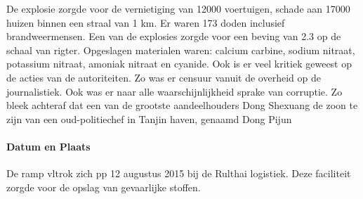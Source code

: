 \documentclass{article}
\begin{document}
	De explosie zorgde voor de vernietiging van 12000 voertuigen, schade aan 17000 huizen binnen een straal van 1 km. Er waren 173 doden inclusief brandweermensen.
	Een van de explosies zorgde voor  een beving van 2.3 op de schaal van rigter.
	Opgeslagen materialen  waren: calcium carbine, sodium nitraat, potassium nitraat, amoniak nitraat en cyanide.
	Ook is er veel kritiek geweest op de acties van de autoriteiten. Zo was er censuur vanuit de overheid op de journalistiek.
	Ook was er naar alle waarschijnlijkheid sprake van corruptie. Zo bleek achteraf dat een van de grootste aandeelhouders Dong Shexuang de zoon te zijn van een oud-politiechef in Tanjin haven, genaamd Dong Pijun
	\paragraph{Datum en Plaats} 	\newline \indent 
	De ramp vltrok zich pp 12 augustus 2015  bij de Rulthai logistiek. Deze faciliteit zorgde voor de opslag van  gevaarlijke stoffen.
	
\end{document}
